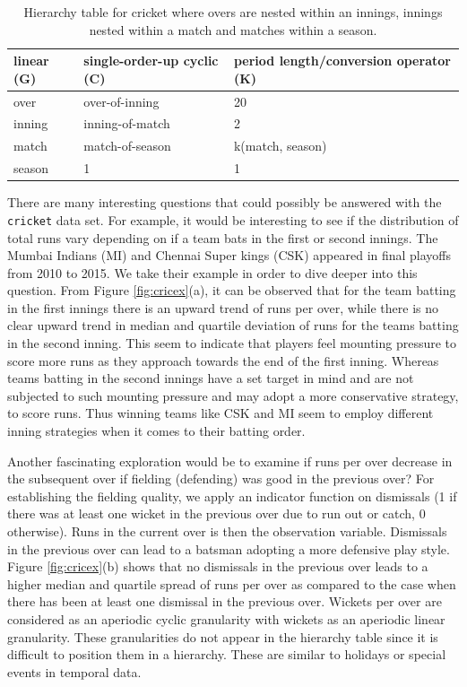 \documentclass[12pt]{article}
\begin{document}
\begin{table}

\caption{\label{tab:hierarchy-cric}Hierarchy table for cricket where overs are nested within an innings, innings nested within a match and matches within a season.}
\centering
\begin{tabular}[t]{lll}
\toprule
linear (G) & single-order-up cyclic (C) & period length/conversion operator (K)\\
\midrule
over & over-of-inning & 20\\
inning & inning-of-match & 2\\
match & match-of-season & k(match, season)\\
season & 1 & 1\\
\bottomrule
\end{tabular}
\end{table}

\noindent There are many interesting questions that could possibly be answered with the \texttt{cricket} data set. For example, it would be interesting to see if the distribution of total runs vary depending on if a team bats in the first or second innings. The Mumbai Indians (MI) and Chennai Super kings (CSK) appeared in final playoffs from 2010 to 2015. We take their example in order to dive deeper into this question. From Figure \ref{fig:cricex}(a), it can be observed that for the team batting in the first innings there is an upward trend of runs per over, while there is no clear upward trend in median and quartile deviation of runs for the teams batting in the second inning. This seem to indicate that players feel mounting pressure to score more runs as they approach towards the end of the first inning. Whereas teams batting in the second innings have a set target in mind and are not subjected to such mounting pressure and may adopt a more conservative strategy, to score runs. Thus winning teams like CSK and MI seem to employ different inning strategies when it comes to their batting order.

\noindent Another fascinating exploration would be to examine if runs per over decrease in the subsequent over if fielding (defending) was good in the previous over? For establishing the fielding quality, we apply an indicator function on dismissals (1 if there was at least one wicket in the previous over due to run out or catch, 0 otherwise). Runs in the current over is then the observation variable. Dismissals in the previous over can lead to a batsman adopting a more defensive play style. Figure \ref{fig:cricex}(b) shows that no dismissals in the previous over leads to a higher median and quartile spread of runs per over as compared to the case when there has been at least one dismissal in the previous over. Wickets per over are considered as an aperiodic cyclic granularity with wickets as an aperiodic linear granularity. These granularities do not appear in the hierarchy table since it is difficult to position them in a hierarchy. These are similar to holidays or special events in temporal data.
\end{document}
